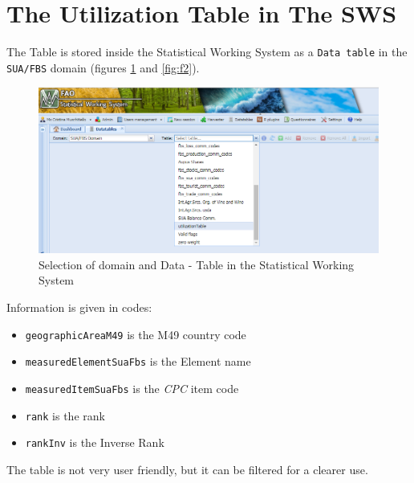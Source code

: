 \documentclass[]{article}
\providecommand{\tightlist}{%
  \setlength{\itemsep}{0pt}\setlength{\parskip}{0pt}}
\begin{document}
\section{The Utilization Table in The
SWS}\label{the-utilization-table-in-the-sws}

The Table is stored inside the Statistical Working System as a
\texttt{Data\ table} in the \texttt{SUA/FBS} domain (figures
\ref{fig:f1} and \ref{fig:f2}).

\begin{figure}[H]

{\centering \includegraphics[width=0.9\linewidth]{images/UtilizationTable/01_domainSelection} 

}

\caption{\label{fig:f1}Selection of domain and Data - Table in the Statistical Working System}\label{fig:f1}
\end{figure}

Information is given in codes:

\begin{itemize}
\tightlist
\item
  \texttt{geographicAreaM49} is the M49 country code
\item
  \texttt{measuredElementSuaFbs} is the Element name
\item
  \texttt{measuredItemSuaFbs} is the \emph{CPC} item code
\item
  \texttt{rank} is the rank
\item
  \texttt{rankInv} is the Inverse Rank
\end{itemize}

The table is not very user friendly, but it can be filtered for a
clearer use.
\end{document}
